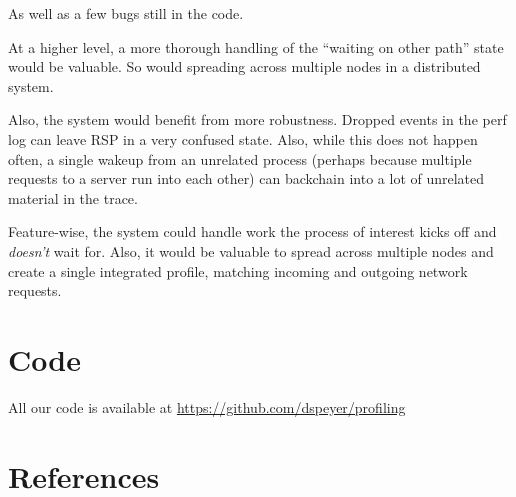 \documentclass[10pt]{article}
\begin{document}
As well as a few bugs still in the code.

At a higher level, a more thorough handling of the ``waiting on other path'' state would be valuable.  So would spreading across multiple nodes in a distributed system.

Also, the system would benefit from more robustness.  Dropped events in the perf log can leave RSP in a very confused state.  Also, while this does not happen often, a single wakeup from an unrelated process (perhaps because multiple requests to a server run into each other) can backchain into a lot of unrelated material in the trace.

Feature-wise, the system could handle work the process of interest kicks off and \emph{doesn't} wait for.  Also, it would be valuable to spread across multiple nodes and create a single integrated profile, matching incoming and outgoing network requests.


\section{Code}

All our code is available at \url{https://github.com/dspeyer/profiling}

\section{References}
\end{document}
